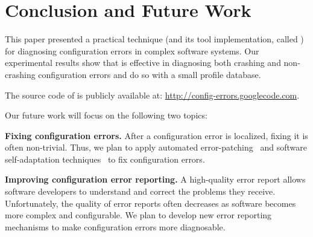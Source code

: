 \section{Conclusion and Future Work}

This paper presented a practical technique (and
its tool implementation, called \ourtool) for diagnosing
configuration errors in complex software systems.
Our experimental results show that \ourtool is effective in
diagnosing both crashing and non-crashing configuration errors
and do so with a small profile database.

The source code of \ourtool is publicly available at:
\url{http://config-errors.googlecode.com}.

\vspace{1mm}

Our future
work will focus on the following two topics:

\textbf{Fixing configuration errors.} After a configuration error
is localized, fixing it is
often non-trivial. Thus, we
plan to apply automated error-patching~\cite{rangefix} and
software self-adaptation techniques~\cite{Wang:2009:STR, Mori:2011:LSU} to
fix configuration errors.


\textbf{Improving configuration error reporting.} A high-quality
error report allows software developers to understand and correct the problems
they receive. 
Unfortunately, the quality of error reports often
decreases as software becomes more complex and configurable.
We plan to develop new error reporting mechanisms
to make configuration errors
more diagnosable.

